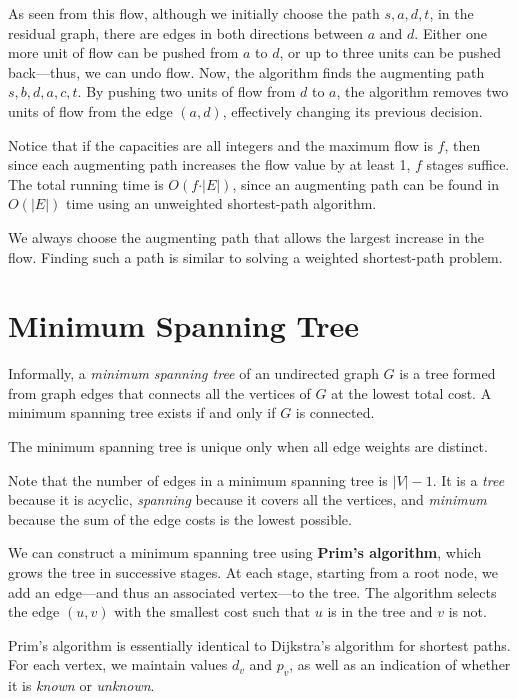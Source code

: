 As seen from this flow, although we initially choose the path \(s, a, d, t\), in the residual graph, there are edges in both directions between \(a\) and \(d\). Either one more unit of flow can be pushed from \(a\) to \(d\), or up to three units can be pushed back—thus, we can undo flow. Now, the algorithm finds the augmenting path \(s, b, d, a, c, t\). By pushing two units of flow from \(d\) to \(a\), the algorithm removes two units of flow from the edge \((a, d)\), effectively changing its previous decision.

Notice that if the capacities are all integers and the maximum flow is \(f\), then since each augmenting path increases the flow value by at least 1, \(f\) stages suffice. The total running time is \(O(f \cdot \vert E \vert)\), since an augmenting path can be found in \(O(\vert E \vert)\) time using an unweighted shortest-path algorithm.

\begin{remark}
  We always choose the augmenting path that allows the largest increase in the flow. Finding such a path is similar to solving a weighted shortest-path problem.
\end{remark}

\section{Minimum Spanning Tree}
Informally, a \textit{minimum spanning tree} of an undirected graph \(G\) is a tree formed from graph edges that connects all the vertices of \(G\) at the lowest total cost. A minimum spanning tree exists if and only if \(G\) is connected.

The minimum spanning tree is unique only when all edge weights are distinct.

Note that the number of edges in a minimum spanning tree is \(\vert V \vert - 1\). It is a \textit{tree} because it is acyclic, \textit{spanning} because it covers all the vertices, and \textit{minimum} because the sum of the edge costs is the lowest possible.

We can construct a minimum spanning tree using \textbf{Prim's algorithm}, which grows the tree in successive stages. At each stage, starting from a root node, we add an edge—and thus an associated vertex—to the tree. The algorithm selects the edge \((u, v)\) with the smallest cost such that \(u\) is in the tree and \(v\) is not.

Prim's algorithm is essentially identical to Dijkstra's algorithm for shortest paths. For each vertex, we maintain values \(d_v\) and \(p_v\), as well as an indication of whether it is \textit{known} or \textit{unknown}.

